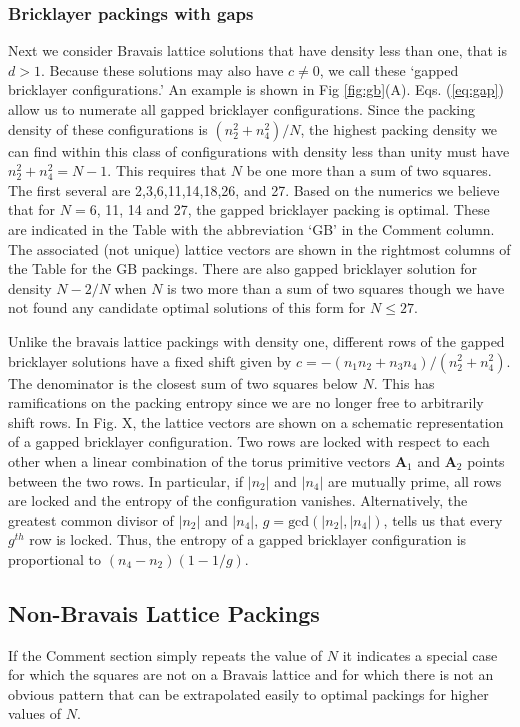 \subsubsection{Bricklayer packings with gaps}
Next we consider Bravais lattice solutions that have density less than one, that is $d>1$.  Because these solutions may also have  $c\neq 0$, we call these `gapped bricklayer configurations.'  An example is shown in Fig \ref{fig:gb}(A).  Eqs. (\ref{eq:gap}) allow us to numerate all gapped bricklayer configurations. Since the packing density of these configurations is $(n_2^2 + n_4^2)/N$, the highest packing density we can find within this class of configurations with density less than unity must have $n_2^2 + n_4^2 = N-1$.  This requires that $N$ be one more than a sum of two squares. The first several are 2,3,6,11,14,18,26, and 27.  Based on the numerics we believe that for $N=6$, 11, 14 and 27, the gapped bricklayer packing is optimal. These are indicated in the Table with the abbreviation `GB' in the Comment column. The associated (not unique) lattice vectors are shown in the rightmost columns of the Table for the GB packings.  There are also gapped bricklayer solution for density $N-2/N$ when $N$ is two more than a sum of two squares though we have not found any candidate optimal solutions of this form for $N \leq 27$.

Unlike the bravais lattice packings with density one, different rows of the gapped bricklayer solutions have a fixed shift given by $c = - (n_1 n_2 + n_3 n_4)/(n_2^2 + n_4^2)$. The denominator is the closest sum of two squares below $N$. This has ramifications on the packing entropy since we are no longer free to arbitrarily shift rows. In Fig. X, the lattice vectors are shown on a schematic representation of a gapped bricklayer configuration. Two rows are locked with respect to each other when a linear combination of the torus primitive vectors $\mathbf{A}_1$ and $\mathbf{A}_2$ points between the two rows. In particular, if $|n_2|$ and $|n_4|$ are mutually prime, all rows are locked and the entropy of the configuration vanishes. Alternatively, the greatest common divisor of $|n_2|$ and $|n_4|$, $g=\textrm{gcd}(|n_2|,|n_4|)$, tells us that every $g^{th}$ row is locked. Thus, the entropy of a gapped bricklayer configuration is proportional to $(n_4-n_2)(1-1/g)$.

\subsection{Non-Bravais Lattice Packings}
If the Comment section simply repeats the value of $N$ it indicates a special case for which the squares are not on a Bravais lattice and for which there is not an obvious pattern that can be extrapolated easily to optimal packings for higher values of $N$.

